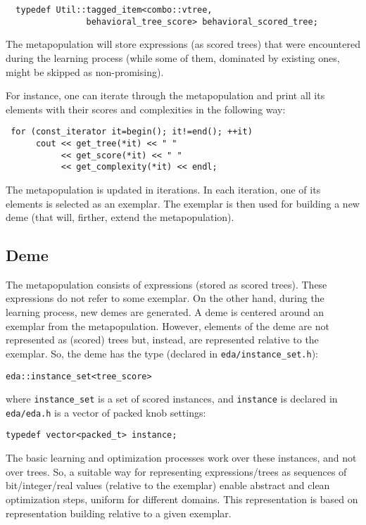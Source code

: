 \documentclass{article}
\begin{document}
\begin{verbatim}
  typedef Util::tagged_item<combo::vtree,
			    behavioral_tree_score> behavioral_scored_tree;
\end{verbatim}

The metapopulation will store expressions (as scored trees) that were
encountered during the learning process (while some of them, dominated
by existing ones, might be skipped as non-promising). 

For instance, one can iterate through the metapopulation and print 
all its elements with their scores and complexities in the following way:

\begin{verbatim}
 for (const_iterator it=begin(); it!=end(); ++it)
      cout << get_tree(*it) << " " 
           << get_score(*it) << " " 
           << get_complexity(*it) << endl;
\end{verbatim}

The metapopulation is updated in iterations. In each iteration, one 
of its elements is selected as an exemplar. The exemplar is then
used for building a new deme (that will, firther, extend the metapopulation).


\subsection{Deme}

The metapopulation consists of expressions (stored as scored trees).
These expressions do not refer to some exemplar. On the other hand,
during the learning process, new demes are generated. 
A deme is centered around an exemplar from the metapopulation. 
However, elements of the deme are not represented as (scored) trees
but, instead, are represented relative to the exemplar. 
So, the deme has the type (declared in \verb|eda/instance_set.h|): 

\begin{verbatim}
eda::instance_set<tree_score>
\end{verbatim}

\noindent
where \verb|instance_set| is a set of scored instances, and \verb|instance|
is declared in \verb|eda/eda.h| is a vector of packed knob settings: 

\begin{verbatim}
typedef vector<packed_t> instance;
\end{verbatim}

The basic learning and optimization processes work over these instances,
and not over trees. So, a suitable way for representing expressions/trees 
as sequences of bit/integer/real values (relative to the exemplar) enable
abstract and clean optimization steps, uniform for different domains.
This representation is based on representation building relative to a
given exemplar.
\end{document}
